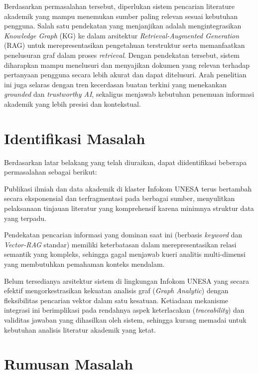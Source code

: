 Berdasarkan permasalahan tersebut, diperlukan sistem pencarian literature akademik yang mampu menemukan sumber paling relevan sesuai kebutuhan pengguna. Salah satu pendekatan yang menjanjikan adalah mengintegrasikan \textit{Knowledge Graph} (KG) ke dalam arsitektur \textit{Retrieval-Augmented Generation} (RAG) untuk merepresentasikan pengetahuan terstruktur serta memanfaatkan penelusuran graf dalam proses \textit{retrieval}. Dengan pendekatan tersebut, sistem diharapkan mampu menelusuri dan menyajikan dokumen yang relevan terhadap pertanyaan pengguna secara lebih akurat dan dapat ditelusuri. Arah penelitian ini juga selaras dengan tren kecerdasan buatan terkini yang menekankan \textit{grounded} dan \textit{trustworthy AI}, sekaligus menjawab kebutuhan penemuan informasi akademik yang lebih presisi dan kontekstual.


\section{Identifikasi Masalah} 

Berdasarkan latar belakang yang telah diuraikan, dapat diidentifikasi beberapa permasalahan sebagai berikut:
\begin{daftar} 
    \item Publikasi ilmiah dan data akademik di klaster Infokom UNESA terus bertambah secara eksponensial dan terfragmentasi pada berbagai sumber, menyulitkan pelaksanaan tinjauan literatur yang komprehensif karena minimnya struktur data yang terpadu. 
    \item  Pendekatan pencarian informasi yang dominan saat ini (berbasis \textit{keyword} dan \textit{Vector-RAG} standar) memiliki keterbatasan dalam merepresentasikan relasi semantik yang kompleks, sehingga gagal menjawab kueri analitis multi-dimensi yang membutuhkan pemahaman konteks mendalam. 
    \item  Belum tersedianya arsitektur sistem di lingkungan Infokom UNESA yang secara efektif mengorkestrasikan kekuatan analisis graf (\textit{Graph Analytic}) dengan fleksibilitas pencarian vektor dalam satu kesatuan. Ketiadaan mekanisme integrasi ini berimplikasi pada rendahnya aspek keterlacakan (\textit{traceability}) dan validitas jawaban yang dihasilkan oleh sistem, sehingga kurang memadai untuk kebutuhan analisis literatur akademik yang ketat.
\end{daftar}

\section{Rumusan Masalah}

